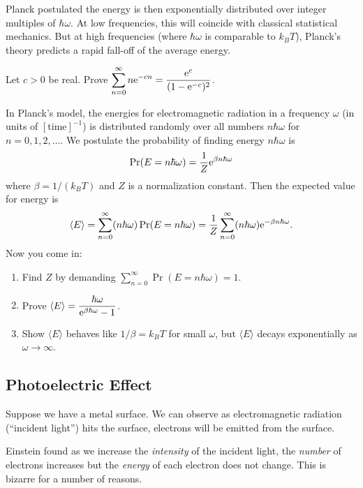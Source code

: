 Planck postulated the energy is then exponentially distributed over
integer multiples of $\hbar\omega$. At low frequencies, this will
coincide with classical statistical mechanics. But at high frequencies
(where $\hbar\omega$ is comparable to $k_{B}T$), Planck's theory
predicts a rapid fall-off of the average energy.

\begin{exercise}
Let $c>0$ be real. Prove $\displaystyle\sum^{\infty}_{n=0}n\mathrm{e}^{-cn}=\frac{\mathrm{e}^{c}}{(1-\mathrm{e}^{-c})^{2}}$.
\end{exercise}

\begin{exercise}
In Planck's model, the energies for electromagnetic radiation in a
frequency $\omega$ (in units of $[\mbox{time}]^{-1}$) is
distributed randomly over all numbers $n\hbar\omega$ for $n=0,1,2,\dots$.
We postulate the probability of finding energy $n\hbar\omega$ is
\begin{equation}
\Pr(E = n\hbar\omega) = \frac{1}{Z}\mathrm{e}^{\beta n\hbar\omega}
\end{equation}
where $\beta = 1/(k_{B}T)$ and $Z$ is a normalization constant. Then the
expected value for energy is
\begin{equation}
\langle E\rangle = \sum^{\infty}_{n=0}(n\hbar\omega)\Pr(E=n\hbar\omega)= \frac{1}{Z}\sum^{\infty}_{n=0}(n\hbar\omega)\mathrm{e}^{-\beta n\hbar\omega}.
\end{equation}
Now you come in:
\begin{enumerate}
\item Find $Z$ by demanding $\sum_{n=0}^{\infty}\Pr(E = n\hbar\omega)=1$.
\item Prove $\displaystyle\langle E\rangle = \frac{\hbar\omega}{\mathrm{e}^{\beta\hbar\omega}-1}$.
\item Show $\langle E\rangle$ behaves like $1/\beta = k_{B}T$ for small $\omega$,
but $\langle E\rangle$ decays exponentially as $\omega\to\infty$.
\end{enumerate}
\end{exercise}

\subsection{Photoelectric Effect}

Suppose we have a metal surface. We can observe as electromagnetic
radiation (``incident light'') hits the surface, electrons will be emitted from the surface.

Einstein found as we increase the \emph{intensity} of the incident
light, the \emph{number} of electrons increases but the \emph{energy} of
each electron does not change. This is bizarre for a number of reasons.

